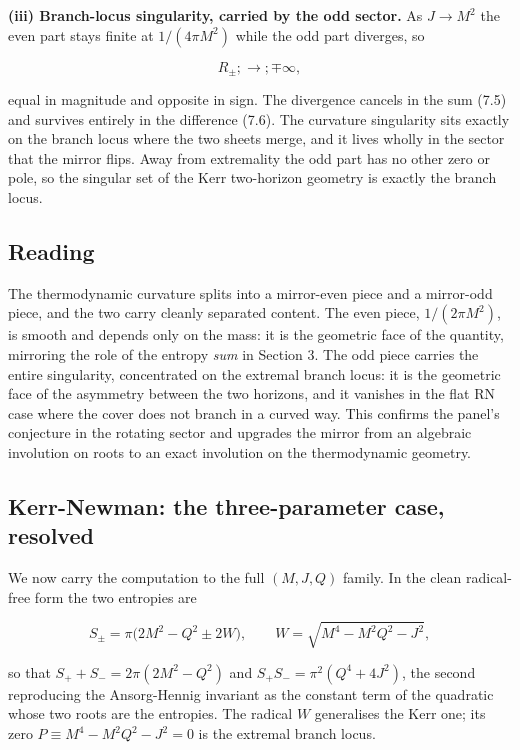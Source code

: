 \documentclass[11pt]{article}
\begin{document}
\textbf{(iii) Branch-locus singularity, carried by the odd sector.} As $J \to M^2$ the even part stays finite at $1/(4\pi M^2)$ while the odd part diverges, so

\begin{equation*}
R_\pm ;\longrightarrow; \mp\infty ,
\end{equation*}

equal in magnitude and opposite in sign. The divergence cancels in the sum (7.5) and survives entirely in the difference (7.6). The curvature singularity sits exactly on the branch locus where the two sheets merge, and it lives wholly in the sector that the mirror flips. Away from extremality the odd part has no other zero or pole, so the singular set of the Kerr two-horizon geometry is exactly the branch locus.

\subsection{Reading}

The thermodynamic curvature splits into a mirror-even piece and a mirror-odd piece, and the two carry cleanly separated content. The even piece, $1/(2\pi M^2)$, is smooth and depends only on the mass: it is the geometric face of the quantity, mirroring the role of the entropy \emph{sum} in Section 3. The odd piece carries the entire singularity, concentrated on the extremal branch locus: it is the geometric face of the asymmetry between the two horizons, and it vanishes in the flat RN case where the cover does not branch in a curved way. This confirms the panel's conjecture in the rotating sector and upgrades the mirror from an algebraic involution on roots to an exact involution on the thermodynamic geometry.

\subsection{Kerr-Newman: the three-parameter case, resolved}

We now carry the computation to the full $(M,J,Q)$ family. In the clean radical-free form the two entropies are

\begin{equation*}
S_\pm = \pi\big(2M^2 - Q^2 \pm 2W\big), \qquad W = \sqrt{M^4 - M^2Q^2 - J^2},
\tag{7.7}
\end{equation*}

so that $S_+ + S_- = 2\pi(2M^2 - Q^2)$ and $S_+ S_- = \pi^2(Q^4 + 4J^2)$, the second reproducing the Ansorg-Hennig invariant as the constant term of the quadratic whose two roots are the entropies. The radical $W$ generalises the Kerr one; its zero $P \equiv M^4 - M^2Q^2 - J^2 = 0$ is the extremal branch locus.
\end{document}
